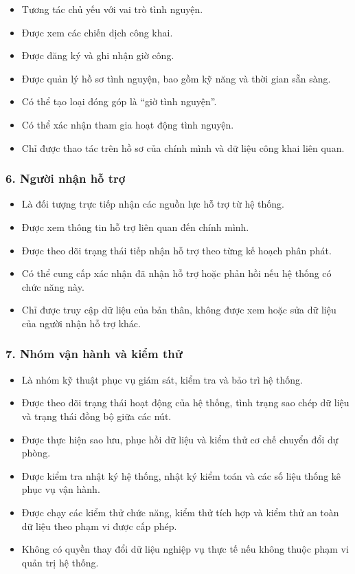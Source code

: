 \documentclass[12pt,a4paper]{article}
\begin{document}
\begin{itemize}
    \item Tương tác chủ yếu với vai trò tình nguyện.
    \item Được xem các chiến dịch công khai.
    \item Được đăng ký và ghi nhận giờ công.
    \item Được quản lý hồ sơ tình nguyện, bao gồm kỹ năng và thời gian sẵn sàng.
    \item Có thể tạo loại đóng góp là ``giờ tình nguyện''.
    \item Có thể xác nhận tham gia hoạt động tình nguyện.
    \item Chỉ được thao tác trên hồ sơ của chính mình và dữ liệu công khai liên quan.
\end{itemize}

\subsubsection*{6. Người nhận hỗ trợ}

\begin{itemize}
    \item Là đối tượng trực tiếp nhận các nguồn lực hỗ trợ từ hệ thống.
    \item Được xem thông tin hỗ trợ liên quan đến chính mình.
    \item Được theo dõi trạng thái tiếp nhận hỗ trợ theo từng kế hoạch phân phát.
    \item Có thể cung cấp xác nhận đã nhận hỗ trợ hoặc phản hồi nếu hệ thống có chức năng này.
    \item Chỉ được truy cập dữ liệu của bản thân, không được xem hoặc sửa dữ liệu của người nhận hỗ trợ khác.
\end{itemize}

\subsubsection*{7. Nhóm vận hành và kiểm thử}

\begin{itemize}
    \item Là nhóm kỹ thuật phục vụ giám sát, kiểm tra và bảo trì hệ thống.
    \item Được theo dõi trạng thái hoạt động của hệ thống, tình trạng sao chép dữ liệu và trạng thái đồng bộ giữa các nút.
    \item Được thực hiện sao lưu, phục hồi dữ liệu và kiểm thử cơ chế chuyển đổi dự phòng.
    \item Được kiểm tra nhật ký hệ thống, nhật ký kiểm toán và các số liệu thống kê phục vụ vận hành.
    \item Được chạy các kiểm thử chức năng, kiểm thử tích hợp và kiểm thử an toàn dữ liệu theo phạm vi được cấp phép.
    \item Không có quyền thay đổi dữ liệu nghiệp vụ thực tế nếu không thuộc phạm vi quản trị hệ thống.
\end{itemize}
\end{document}
